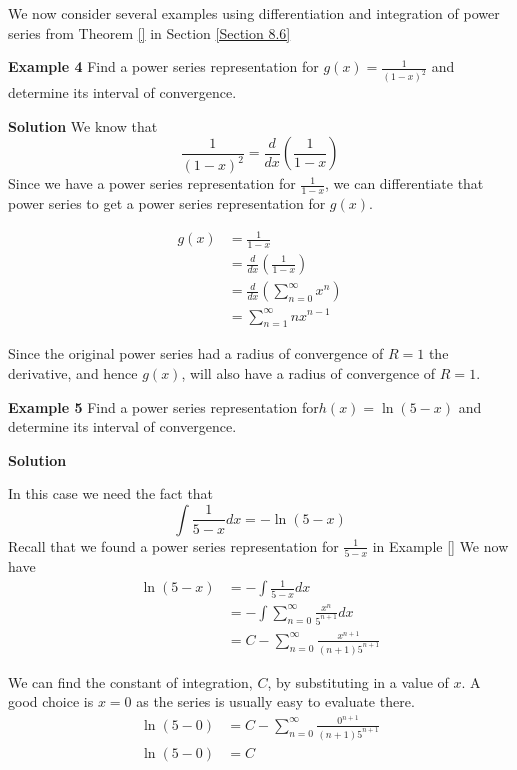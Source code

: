 \documentclass[10pt]{article}
\newcommand{\ds}{\displaystyle}
\begin{document}
We now consider several examples using differentiation and integration of power series from Theorem \ref{} in Section \ref{Section 8.6}

{\bf Example 4}  Find a power series representation for $\ds g(x) = \frac{1}{(1-x)^2}$ and determine its interval of convergence.  

{\bf Solution}
We know that
$$\frac{1}{(1-x)^2} = \frac{d}{dx} \left( \frac{1}{1-x} \right)$$
Since we have a power series  representation for $\ds \frac{1}{1-x}$, we can differentiate that power series to get a power series representation for $g(x)$.  

\begin{align*}
 g(x) & = \frac{1}{1-x} \\
                       & = \frac{d}{dx} \left( \frac{1}{1-x} \right) \\
                       & =  \frac{d}{dx} \left( \sum\limits_{n=0}^{\infty} x^n \right)\\
                       & =  \sum\limits_{n=1}^{\infty} nx^{n-1}
\end{align*}

Since the original power series had a radius of convergence of $R=1$ the derivative, and hence $g(x)$, will also have a radius of convergence of $R=1$.  


{\bf Example 5}  Find a power series representation for$h(x) = \ln(5-x)$ and determine its interval of convergence.  

{\bf Solution}

In this case we need the fact that $$\ds\int \frac{1}{5-x} dx = -\ln(5-x)$$
Recall that we found a power series representation for $\ds\frac{1}{5-x}$ in Example \ref{}
We now have
\begin{align*}\ln(5-x) & =  -\ds\int \frac{1}{5-x} dx \\
                                    & =  -\ds\int \sum\limits_{n=0}^{\infty} \frac{x^n}{5^{n+1}} dx \\
                                    & =  C - \sum\limits_{n=0}^{\infty} \frac{x^{n+1}}{(n+1)5^{n+1}}
\end{align*}

                                  
We can find the constant of integration, $C$, by substituting in a value of $x$.  A good choice is $x=0$ as the series is usually easy to evaluate there.  
\begin{align*}
\ln(5-0) & = C - \sum\limits_{n=0}^{\infty} \frac{0^{n+1}}{(n+1)5^{n+1}} \\
                 \ln (5-0) & =  C 
\end{align*}
                 
\end{document}
